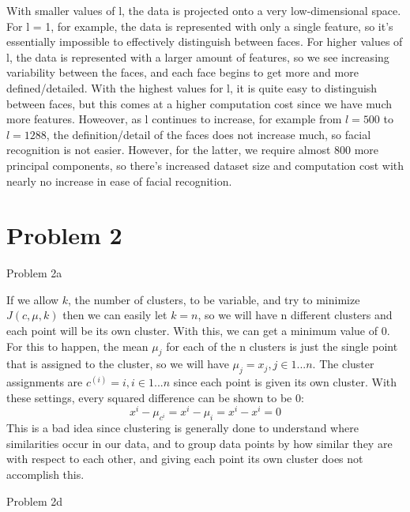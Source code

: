 \documentclass[11pt]{article}
\newcommand{\solution}[1]{{{\color{blue}{\bf Solution:} {#1}}}}
\begin{document}
\begin{enumerate}
{With smaller values of l, the data is projected onto a very low-dimensional space. For l = 1, for example, the data is represented with only a single feature, so it's essentially impossible to effectively distinguish between faces. For higher values of l, the data is represented with a larger amount of features, so we see increasing variability between the faces, and each face begins to get more and more defined/detailed. With the highest values for l, it is quite easy to distinguish between faces, but this comes at a higher computation cost since we have much more features. Howeover, as l continues to increase, for example from $l = 500$ to $ l = 1288$, the definition/detail of the faces does not increase much, so facial recognition is not easier. However, for the latter, we require almost 800 more principal components, so there's increased dataset size and computation cost with nearly no increase in ease of facial recognition. 
}
\end{enumerate}

\newpage
\section{Problem 2}

\item Problem 2a

\solution{
If we allow $k$, the number of clusters, to be variable, and try to minimize $J(c, \mu, k)$ then we can easily let $k = n$, so we will have n different clusters and each point will be its own cluster. With this, we can get a minimum value of 0. For this to happen, the mean $\mu_j$ for each of the n clusters is just the single point that is assigned to the cluster, so we will have $\mu_j = x_j, j \in {1...n}$. The cluster assignments are $c^{(i)} = i, i \in {1...n}$ since each point is given its own cluster. With these settings, every squared difference can be shown to be 0: \[x^i - \mu_{c^i} = x^i - \mu_i = x^i - x^i = 0\] This is a bad idea since clustering is generally done to understand where similarities occur in our data, and to group data points by how similar they are with respect to each other, and giving each point its own cluster does not accomplish this. 
}
\item Problem 2d
\end{document}
